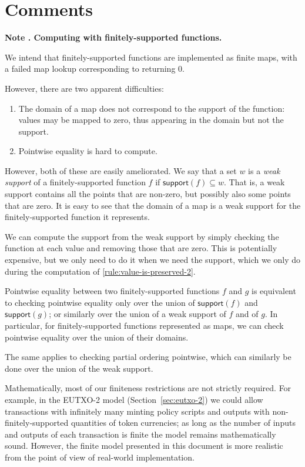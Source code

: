 \documentclass[a4paper]{article}
\newcounter{note}
\newcommand{\note}[1]{
  \bigskip
  \refstepcounter{note}
  \noindent\textbf{Note \thenote. #1}
}
\newcommand{\msf}[1]{\ensuremath{\mathsf{#1}}}
\newcommand{\support}{\msf{support}}
\begin{document}
\appendix
\section{Comments}
\label{appendix:comments}

\note{Computing with finitely-supported functions.}
\label{note:finitely-supported-functions}
We intend that finitely-supported functions are implemented as finite
maps, with a failed map lookup corresponding to returning 0.

However, there are two apparent difficulties:
\begin{enumerate}
  \item The domain of a map does not correspond to the support of the function:
    values may be mapped to zero, thus appearing in the domain but not the support.
  \item Pointwise equality is hard to compute.
\end{enumerate}

However, both of these are easily ameliorated. We say that a set $w$ is a \textit{weak support}
of a finitely-supported function $f$ if $\support(f) \subseteq w$. That is, a
weak support contains all the points that are non-zero, but possibly also some
points that are zero. It is easy to see that the domain of a map is a weak
support for the finitely-supported function it represents.

We can compute the support from the weak support by simply checking the function
at each value and removing those that are zero. This is potentially expensive,
but we only need to do it when we need the support, which we only do during the
computation of \cref{rule:value-is-preserved-2}.

Pointwise equality between two finitely-supported functions $f$ and $g$ is
equivalent to checking pointwise equality only over the union of $\support(f)$
and $\support(g)$; or similarly over the union of a weak support of $f$ and of
$g$. In particular, for finitely-supported functions represented as maps, we can
check pointwise equality over the union of their domains.

The same applies to checking partial ordering pointwise, which can similarly
be done over the union of the weak support.

\medskip

Mathematically, most of our finiteness restrictions are not strictly
required.  For example, in the EUTXO-2 model
(Section~\ref{sec:eutxo-2}) we could allow transactions with
infinitely many minting policy scripts and outputs with
non-finitely-supported quantities of token currencies;  as long as the
number of inputs and outputs of each transaction is finite the model
remains mathematically sound.  However, the finite model presented in
this document is more realistic from the point of view of real-world
implementation.
\end{document}
